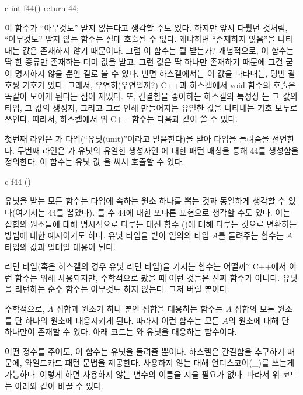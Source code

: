 \begin{snip}{c}
int f44() { return 44; }
\end{snip}
이 함수가 ``아무것도'' 받지 않는다고 생각할 수도 있다. 하지만 앞서 다뤘던 것처럼, ``아무것도'' 받지 않는 함수는 절대 호출될 수 없다.
왜냐하면 ``존재하지 않음''을 나타내는 값은 존재하지 않기 때문이다. 그럼 이 함수는 뭘 받는가?
개념적으로, 이 함수는 딱 한 종류만 존재하는 더미 값을 받고, 그런 값은 딱 하나만 존재하기 때문에 그걸 굳이 명시하지 않을 뿐인 걸로 볼 수 있다.
반면 하스켈에서는 이 값을 나타내는, 텅빈 괄호쌍 \code{()} 기호가 있다.
그래서, 우연히(우연일까?) C++과 하스켈에서 void 함수의 호출은 똑같아 보이게 된다는 점이 재밌다.
또, 간결함을 좋아하는 하스켈의 특성상 \code{()}는 그 값의 타입, 그 값의 생성자, 그리고 그로 인해 만들어지는 유일한 값을 나타내는 기호 모두로 쓰인다.
따라서, 하스켈에서 위 C++ 함수는 다음과 같이 쓸 수 있다.

첫번째 라인은 가 \code{()} 타입(``유닛(unit)''이라고 발음한다)을 받아  타입을 돌려줌을 선언한다.
두번째 라인은 가 유닛의 유일한 생성자인 \code{()}에 대한 패턴 매칭을 통해 44를 생성함을 정의한다. 이 함수는 유닛 값 \code{()}을 써서 호출할 수 있다.

\begin{snip}{c}
f44 ()
\end{snip}

유닛을 받는 모든 함수는 \trTarget 타입에 속하는 원소 하나를 뽑는 것과 동일하게 생각할 수 있다(여기서는  44를 뽑았다).
를 수 44에 대한 또다른 표현으로 생각할 수도 있다. 이는 집합의 원소들에 대해 명시적으로 다루는 대신 함수 (\trArrow)에 대해 다루는 것으로 변환하는 방법에 대한 예시이기도 하다.
유닛 타입을 받아 임의의 타입 $A$를 돌려주는 함수는 $A$ 타입의 값과 일대일 대응이 된다.

 리턴 타입(혹은 하스켈의 경우 유닛 리턴 타입)을 가지는 함수는 어떨까?
C++에서 이런 함수는 \trSideEffect\를 위해 사용되지만, 수학적으로 봤을 때 이런 것들은 진짜 함수가 아니다.
유닛을 리턴하는 순수 함수는 아무것도 하지 않는다. 그저 \trArgument\를 버릴 뿐이다.

수학적으로, $A$ 집합과 원소가 하나 뿐인 집합을 대응하는 함수는 $A$ 집합의 모든 원소를 단 하나의 원소에 대응시키게 된다.
따라서 이런 함수는 모든 $A$의 원소에 대해 단 하나만이 존재할 수 있다. 아래 코드는 와 유닛을 대응하는 함수이다.

어떤 정수를 주어도, 이 함수는 유닛을 돌려줄 뿐이다. 하스켈은 간결함을 추구하기 때문에, 와일드카드 패턴 문법을 제공한다. 사용하지 않는  대해 언더스코어(\_)를 쓰는게 가능하다.
이렇게 하면 사용하지 않는 변수의 이름을 지을 필요가 없다. 따라서 위 코드는 아래와 같이 바꿀 수 있다.

